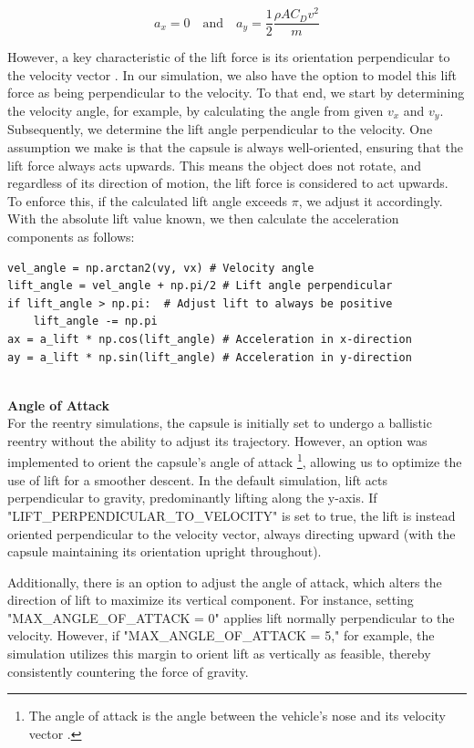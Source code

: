 \documentclass[runningheads]{llncs}
\begin{document}
\begin{equation}
a_x = 0 \quad \text{and} \quad a_y = \frac{1}{2} \frac{\rho A C_D v^2}{m}
\end{equation}


However, a key characteristic of the lift force is its orientation perpendicular to the velocity vector \cite{reentry_matters}. In our simulation, we also have the option to model this lift force as being perpendicular to the velocity. To that end, we start by determining the velocity angle, for example, by calculating the angle from given \( v_x \) and \( v_y \). Subsequently, we determine the lift angle perpendicular to the velocity. One assumption we make is that the capsule is always well-oriented, ensuring that the lift force always acts upwards. This means the object does not rotate, and regardless of its direction of motion, the lift force is considered to act upwards. To enforce this, if the calculated lift angle exceeds \(\pi\), we adjust it accordingly. With the absolute lift value known, we then calculate the acceleration components as follows:

\begin{verbatim}
vel_angle = np.arctan2(vy, vx) # Velocity angle
lift_angle = vel_angle + np.pi/2 # Lift angle perpendicular
if lift_angle > np.pi:  # Adjust lift to always be positive   
    lift_angle -= np.pi 
ax = a_lift * np.cos(lift_angle) # Acceleration in x-direction
ay = a_lift * np.sin(lift_angle) # Acceleration in y-direction
\end{verbatim}


\textbf{\\Angle of Attack\\}
For the reentry simulations, the capsule is initially set to undergo a ballistic reentry without the ability to adjust its trajectory. However, an option was implemented to orient the capsule's angle of attack \footnote{The angle of attack is the angle between the vehicle’s nose and its velocity vector \cite{returning_space}.}, allowing us to optimize the use of lift for a smoother descent. In the default simulation, lift acts perpendicular to gravity, predominantly lifting along the y-axis. 
If "LIFT\_PERPENDICULAR\_TO\_VELOCITY" is set to true, the lift is instead oriented perpendicular to the velocity vector, always directing upward (with the capsule maintaining its orientation upright throughout).

 Additionally, there is an option to adjust the angle of attack, which alters the direction of lift to maximize its vertical component. For instance, setting "MAX\_ANGLE\_OF\_ATTACK = 0" applies lift normally perpendicular to the velocity. However, if "MAX\_ANGLE\_OF\_ATTACK = 5," for example, the simulation utilizes this margin to orient lift as vertically as feasible, thereby consistently countering the force of gravity.
\end{document}
